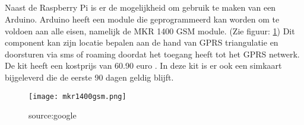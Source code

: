 \subsection{}
Naast de Raspberry Pi is er de mogelijkheid om gebruik te maken van een Arduino. Arduino heeft een module die geprogrammeerd kan worden om te voldoen aan alle eisen, namelijk de MKR 1400 GSM module. (Zie figuur: \ref{fig:mkr1400}) Dit component kan zijn locatie bepalen aan de hand van GPRS triangulatie en doorsturen via sms of roaming doordat het toegang heeft tot het GPRS netwerk. De kit heeft een kostprijs van 60.90 euro \autocite{arduino}. In deze kit is er ook een simkaart bijgeleverd die de eerste 90 dagen geldig blijft.
\begin{figure}
    \texttt{[image: mkr1400gsm.png]}
    \caption{source:google}
    \label{fig:mkr1400}
\end{figure}